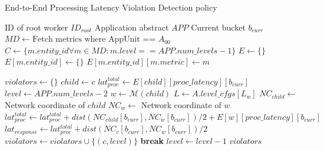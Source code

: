 \begin{algorithm}
\caption{End-to-End Processing Latency Violation Detection policy}
\label{algo:oneedge_violation_detection}
\begin{algorithmic}[1]
\Require ID of root worker $ID_{root}$ 
\Require Application abstract $APP$
\Require Current bucket $b_{curr}$
\State $MD \gets \text{Fetch metrics where AppUnit == }A_{00}$
\State $C \gets \{ m.entity\_id \forall m \in MD : m.level == APP.num\_levels-1 \}$
\State $E \gets \{\}$ 
        \State $E[m.entity\_id] \gets \{\}$
    \EndIf
    \State $E[m.entity\_id][m.metric] \gets m$ 
\EndFor

\State $violators \gets \{\}$
    \State $child \gets c$  
    \State $lat_{proc}^{total} \gets E[child][proc\_latency][b_{curr}]$
    \State $level \gets APP.num\_levels-2$ 
     
        \State $w \gets \mathcal{M} \left( child \right)$
        \State $L \gets A.level\_cfgs [L_w]$
        \State $NC_{child} \gets $ Network coordinate of $child$ 
        \State $NC_{w} \gets $ Network coordinate of $w$
        \State $lat_{proc}^{total} \gets lat_{proc}^{total} + dist \left( NC_{child}[b_{curr}], NC_w[b_{curr}] \right)/2 + E[w][proc\_latency][b_{curr}]$
        \State $lat_{response} \gets lat_{proc}^{total} + dist \left( NC_{c}[b_{curr}], NC_w[b_{curr}] \right)/2$
            \State $violators \gets violators \cup \{ \left( c, level \right) \}$
            \State \textbf{break}
        \EndIf
        \State $level \gets level - 1$
    \EndWhile
\EndFor
\Return $violators$
\end{algorithmic}
\end{algorithm}


